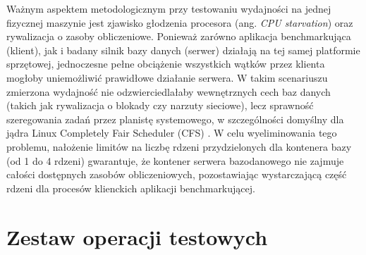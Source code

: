 Ważnym aspektem metodologicznym przy testowaniu wydajności na jednej fizycznej maszynie jest zjawisko głodzenia procesora (ang. \emph{CPU starvation}) oraz rywalizacja o zasoby obliczeniowe. Ponieważ zarówno aplikacja benchmarkująca (klient), jak i badany silnik bazy danych (serwer) działają na tej samej platformie sprzętowej, jednoczesne pełne obciążenie wszystkich wątków przez klienta mogłoby uniemożliwić prawidłowe działanie serwera. W takim scenariuszu zmierzona wydajność nie odzwierciedlałaby wewnętrznych cech baz danych (takich jak rywalizacja o blokady czy narzuty sieciowe), lecz sprawność szeregowania zadań przez planistę systemowego, w szczególności domyślny dla jądra Linux Completely Fair Scheduler (CFS) \cite{love2010}. W celu wyeliminowania tego problemu, nałożenie limitów na liczbę rdzeni przydzielonych dla kontenera bazy (od 1 do 4 rdzeni) gwarantuje, że kontener serwera bazodanowego nie zajmuje całości dostępnych zasobów obliczeniowych, pozostawiając wystarczającą część rdzeni dla procesów klienckich aplikacji benchmarkującej.

\section{Zestaw operacji testowych}

